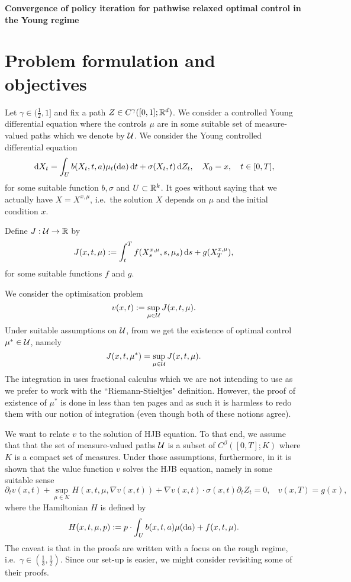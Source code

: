 \documentclass[./main.tex]{subfiles}
\begin{document}
\begin{center} 
{\Large \textbf{Convergence of policy iteration for pathwise relaxed optimal control in the Young regime} }
\end{center}


\section{Problem formulation and objectives}
Let $\gamma\in (\frac 1  2,1]$ and fix a path $Z\in C^\gamma([0,1];\mathbb R^d)$. We consider a controlled Young differential equation where the controls $\mu$ are in some suitable set of measure-valued paths which we denote by $\mathcal U$. We consider the Young controlled differential equation
\[
\dif X_t=\int_U b(X_t,t,a)\mu_t(\diff a)\dif t+\sigma(X_t,t)\dif Z_t, \  \ \ X_0=x, \  \ \ t\in [0,T],
\]
for some suitable function $b,\sigma$ and $U\subset \mathbb R^k$. 
It goes without saying that we actually have $X=X^{x,\mu}$, i.e.\ the solution $X$ depends on $\mu$ and the initial condition $x$. 

Define $J:\mathcal U\to \mathbb R$ by
\[
J(x,t,\mu):=\int_t^Tf(X_s^{x,\mu},s,\mu_s)\,\mathrm{d} s+g(X_T^{x,\mu}),
\]
for some suitable functions $f$ and $g$.

We consider the optimisation problem
\[
v(x,t):=\sup_{\mu\in\mathcal U}J(x,t,\mu).
\]
Under suitable assumptions on $\mathcal U$, from \cite{Mazliak_Nourdin} we get the existence of optimal control $\mu^*\in\mathcal U$, namely
\[
J(x,t,\mu^*)=\sup_{\mu\in\mathcal U}J(x,t,\mu).
\]
The integration in \cite{Mazliak_Nourdin} uses fractional calculus which we are not intending to use as we prefer to work with the ``Riemann-Stieltjes" definition. However, the proof of existence of $\mu^*$ is done in less than ten pages and as such it is harmless to redo them with our notion of integration (even though both of these notions agree).  

We want to relate $v$ to the solution of HJB equation. To that end, we assume that that the set of measure-valued paths $\mathcal U$ is a subset of $C^\beta([0,T];K)$ where $K$ is a compact set of measures. Under those assumptions, furthermore, in \cite{Chakraborty_Honnappa_Tindel} it is shown that the value function $v$ solves the HJB equation, namely in some suitable sense
\[
\partial_t v(x,t)+\sup_{\mu\in K}H(x,t,\mu,\nabla v(x,t))+\nabla v(x,t)\cdot\sigma(x,t)\partial_t Z_t=0, \ \ \ \ v(x,T)=g(x),
\]
where the Hamiltonian $H$ is defined by
\[
H(x,t,\mu,p):= p\cdot\int_U b(x,t,a)\mu(\mathrm{d} a)+f(x,t,\mu).
\]
The caveat is that in \cite{Chakraborty_Honnappa_Tindel} the proofs are written with a focus on the rough regime, i.e.\ $\gamma\in (\frac 13,\frac 1 2)$. Since our set-up is easier, we might consider revisiting some of their proofs.
\end{document}
